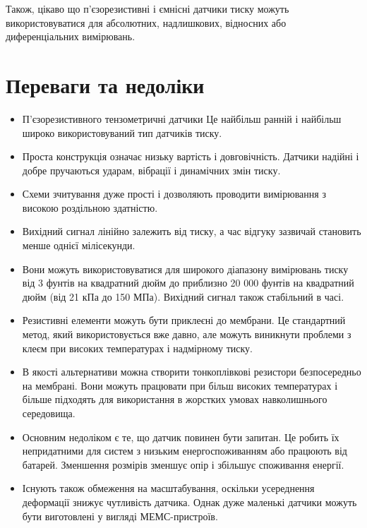 \documentclass[a4paper,fontsize=12]{report}
\begin{document}
  Також, цікаво що п'єзорезистивні і ємнісні датчики тиску можуть використовуватися для абсолютних, надлишкових, відносних або диференціальних вимірювань. \\
\section{Переваги та недоліки}
 { \begin{itemize}
  \item П'єзорезистивного тензометричні датчики
  Це найбільш ранній і найбільш широко використовуваний тип датчиків тиску.

  \item Проста конструкція означає низьку вартість і довговічність. Датчики надійні і добре пручаються ударам, вібрації і динамічних змін тиску.

  \item Схеми зчитування дуже прості і дозволяють проводити вимірювання з високою роздільною здатністю.

  \item Вихідний сигнал лінійно залежить від тиску, а час відгуку зазвичай становить менше однієї мілісекунди.

  \item Вони можуть використовуватися для широкого діапазону вимірювань тиску від 3 фунтів на квадратний дюйм до приблизно 20 000 фунтів на квадратний дюйм (від 21 кПа до 150 МПа). Вихідний сигнал також стабільний в часі.

  \item Резистивні елементи можуть бути приклеєні до мембрани. Це стандартний метод, який використовується вже давно, але можуть виникнути проблеми з клеєм при високих температурах і надмірному тиску.

  \item В якості альтернативи можна створити тонкоплівкові резистори безпосередньо на мембрані. Вони можуть працювати при більш високих температурах і більше підходять для використання в жорстких умовах навколишнього середовища.

  \item Основним недоліком є те, що датчик повинен бути запитан. Це робить їх непридатними для систем з низьким енергоспоживанням або працюють від батарей. Зменшення розмірів зменшує опір і збільшує споживання енергії.

  \item Існують також обмеження на масштабування, оскільки усереднення деформації знижує чутливість датчика. Однак дуже маленькі датчики можуть бути виготовлені у вигляді МЕМС-пристроїв.


\end{itemize}}
\end{document}

